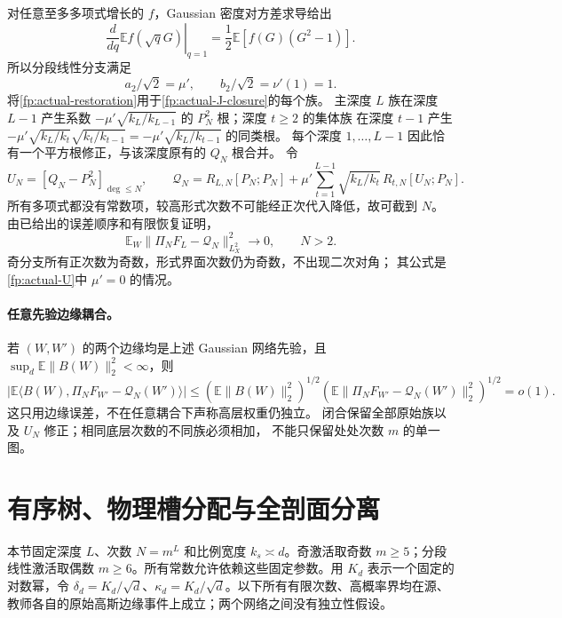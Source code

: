 \documentclass[a4paper]{tufte-handout}
\begin{document}
\begin{fullwidth}
对任意至多多项式增长的 $f$，Gaussian 密度对方差求导给出
\[
 \left.\frac{d}{dq}\mathbb E f(\sqrt qG)\right|_{q=1}
 =\frac12\mathbb E[f(G)(G^2-1)].
\]
所以分段线性分支满足
\begin{equation}\label{fp:actual-coeff-identities}
 a_2/\sqrt2=\mu',\qquad b_2/\sqrt2=\nu'(1)=1.
\end{equation}
将\eqref{fp:actual-restoration}用于\eqref{fp:actual-J-closure}的每个族。
主深度 $L$ 族在深度 $L-1$ 产生系数
$-\mu'\sqrt{k_L/k_{L-1}}$ 的 $P_N^2$ 根；深度 $t\geq2$ 的集体族
在深度 $t-1$ 产生
$-\mu'\sqrt{k_L/k_t}\sqrt{k_t/k_{t-1}}
=-\mu'\sqrt{k_L/k_{t-1}}$ 的同类根。
每个深度 $1,\ldots,L-1$ 因此恰有一个平方根修正，与该深度原有的 $Q_N$ 根合并。
令
\begin{equation}\label{fp:actual-U}
 U_N=[Q_N-P_N^2]_{\deg\leq N},\qquad
 \mathcal Q_N=R_{L,N}[P_N;P_N]
 +\mu'\sum_{t=1}^{L-1}\sqrt{k_L/k_t}\,R_{t,N}[U_N;P_N].
\end{equation}
所有多项式都没有常数项，较高形式次数不可能经正次代入降低，故可截到 $N$。
由已给出的误差顺序和有限恢复证明，
\begin{equation}\label{fp:actual-final}
 \boxed{\displaystyle
 \mathbb E_W\|\Pi_NF_L-\mathcal Q_N\|_{L^2_X}^2\longrightarrow0,
 \qquad N>2.}
\end{equation}
奇分支所有正次数为奇数，形式界面次数仍为奇数，不出现二次对角；
其公式是\eqref{fp:actual-U}中 $\mu'=0$ 的情况。

\paragraph{任意先验边缘耦合。}
若 $(W,W')$ 的两个边缘均是上述 Gaussian 网络先验，且
$\sup_d\mathbb E\|B(W)\|_2^2<\infty$，则
\[
 \left|\mathbb E\langle B(W),\Pi_NF_{W'}-\mathcal Q_N(W')\rangle\right|
 \leq(\mathbb E\|B(W)\|_2^2)^{1/2}
 (\mathbb E\|\Pi_NF_{W'}-\mathcal Q_N(W')\|_2^2)^{1/2}=o(1).
\]
这只用边缘误差，不在任意耦合下声称高层权重仍独立。
闭合保留全部原始族以及 $U_N$ 修正；相同底层次数的不同族必须相加，
不能只保留处处次数 $m$ 的单一图。


\section{有序树、物理槽分配与全剖面分离}\label{fp:history}\label{app:cuts}
本节固定深度 $L$、次数 $N=m^L$ 和比例宽度 $k_s\asymp d$。奇激活取奇数 $m\ge5$；分段线性激活取偶数 $m\ge6$。所有常数允许依赖这些固定参数。用 $K_d$ 表示一个固定的对数幂，令 $\delta_d=K_d/\sqrt d$、$\kappa_d=K_d/\sqrt d$。以下所有有限次数、高概率界均在源、教师各自的原始高斯边缘事件上成立；两个网络之间没有独立性假设。


\end{fullwidth}
\end{document}
